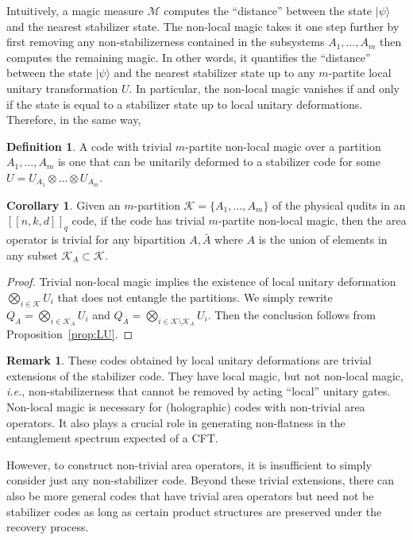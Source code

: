 \documentclass[a4paper,11pt]{article}
\theoremstyle{definition}
\newtheorem{definition}{Definition}[section]
\newtheorem{remark}{Remark}[section]
\newtheorem{corollary}{Corollary}[section]
\numberwithin{equation}{section}
\begin{document}
Intuitively, a magic measure $\mathcal{M}$ computes the ``distance'' between the state $|\psi\rangle$ and the nearest stabilizer state. The non-local magic takes it one step further by first removing any non-stabilizerness contained in the subsystems $A_1,\dots, A_m$ then computes the remaining magic. In other words, it quantifies the ``distance'' between the state $|\psi\rangle$ and the nearest stabilizer state up to any $m$-partite local unitary transformation $U$. In particular, the non-local magic vanishes if and only if the state is equal to a stabilizer state up to local unitary deformations. Therefore, in the same way,
\begin{definition}
    A code with trivial $m$-partite non-local magic over a partition $A_1,\dots, A_m$ is one that can be unitarily deformed to a stabilizer code for some $U=U_{A_1}\otimes \dots\otimes U_{A_m}$.
\end{definition}

\begin{corollary}
    Given an $m$-partition $\mathcal{K}=\{A_1,\dots, A_m\}$ of the physical qudits in an $[[n,k,d]]_q$ code, if the code has trivial $m$-partite non-local magic, then the area operator is trivial for any bipartition $A, \bar{A}$ where $A$ is the union of elements in any subset $\mathcal{K}_A\subset \mathcal{K}$. 
\end{corollary}
\begin{proof}
   Trivial non-local magic implies the existence of local unitary deformation $\bigotimes_{i\in\mathcal{K}}U_i$ that does not entangle the partitions. We simply rewrite $Q_A=\bigotimes_{i\in \mathcal{K}_A} U_i$ and $Q_{\bar{A}}=\bigotimes_{i\in \mathcal{K}\setminus\mathcal{K}_A} U_i$. Then the conclusion follows from Proposition~\ref{prop:LU}.
\end{proof}

\begin{remark}
   These codes obtained by local unitary deformations are trivial extensions of the stabilizer code. They have local magic, but not non-local magic, \emph{i.e.}, non-stabilizerness that cannot be removed by acting ``local'' unitary gates. 
    Non-local magic is necessary for (holographic) codes with non-trivial area operators. It also plays a crucial role in generating non-flatness in the entanglement spectrum expected of a CFT\cite{NLmagicHamma}.
\end{remark}

However, to construct non-trivial area operators, it is insufficient to simply consider just any non-stabilizer code. Beyond these trivial extensions, there can also be more general codes that have trivial area operators but need not be stabilizer codes as long as certain product structures are preserved under the recovery process. 
\end{document}
